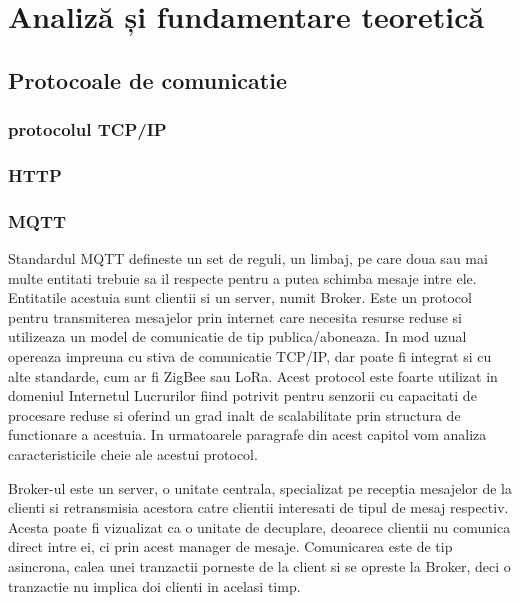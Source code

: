 \chapter{Analiză și fundamentare teoretică}
\label{ch:analysis}
\pagestyle{fancy}

\section{Protocoale de comunicatie}\label{sec:protocols}
\subsection{protocolul TCP/IP}\label{subsec:tcpip}
\subsection{HTTP}\label{sec:http}
\subsection{MQTT}\label{sec:mqtt}
Standardul MQTT defineste un set de reguli, un limbaj, pe care doua sau mai multe entitati trebuie sa il respecte pentru a putea schimba mesaje intre 
ele. Entitatile acestuia sunt clientii si un server, numit Broker. Este un protocol pentru transmiterea mesajelor prin internet care necesita resurse reduse si 
utilizeaza un model de comunicatie de tip publica/aboneaza. In mod uzual opereaza impreuna cu stiva de comunicatie TCP/IP, dar poate fi integrat si cu alte 
standarde, cum ar fi ZigBee sau LoRa. Acest protocol este foarte utilizat in domeniul Internetul Lucrurilor fiind potrivit pentru 
senzorii cu capacitati de procesare reduse si oferind un grad inalt de scalabilitate prin structura de functionare a acestuia. In urmatoarele paragrafe 
din acest capitol vom analiza caracteristicile cheie ale acestui protocol.

Broker-ul este un server, o unitate centrala, specializat pe receptia mesajelor de la clienti si retransmisia acestora catre clientii interesati de 
tipul de mesaj respectiv. Acesta poate fi vizualizat ca o unitate de decuplare, deoarece clientii nu comunica direct intre ei, ci prin acest manager de 
mesaje. Comunicarea este de tip asincrona, calea unei tranzactii porneste de la client si se opreste la Broker, deci o tranzactie nu implica doi clienti 
in acelasi timp. 

